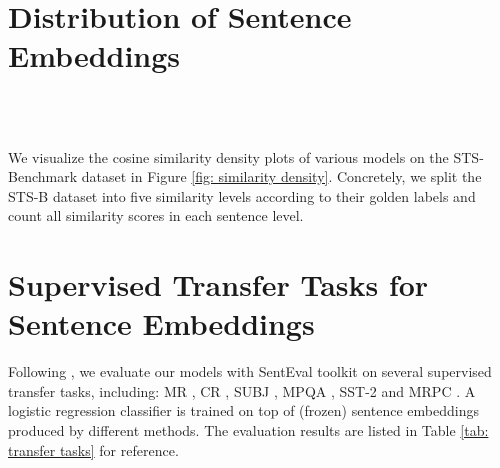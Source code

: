 \documentclass[11pt]{article}
\begin{document}
\section{Distribution of Sentence Embeddings}
\label{sec: appendix distribution}
\begin{figure*} [t!]
	\centering
	\\
	\\
	\caption{Cosine Similarity Density Plots of different models between sentence pairs in STS-B. Pairs are divided into five groups based on ground truth ratings (higher means more similar). The x-axis is the model predicted cosine similarity.}
	\label{fig: similarity density}
\end{figure*}

We visualize the cosine similarity density plots of various models on the STS-Benchmark dataset in Figure \ref{fig: similarity density}. Concretely, we split the STS-B dataset into five similarity levels according to their golden labels and count all similarity scores in each sentence level. 

\section{Supervised Transfer Tasks for Sentence Embeddings}
\label{sec: appendix transfer}
Following \cite{gao2021simcse}, we evaluate our models with SentEval toolkit \cite{ConneauK18senteval} on several supervised transfer tasks, including: MR \cite{pang2005mr}, CR \cite{hu2004cr}, SUBJ \cite{pang2004subj}, MPQA \cite{wiebe2005mpqa}, SST-2 \cite{socher2013sst2} and MRPC \cite{dolan2005mrpc}. A logistic regression classifier is trained on top of (frozen) sentence embeddings produced by different methods. The evaluation results are listed in Table \ref{tab: transfer tasks} for reference.
\end{document}
